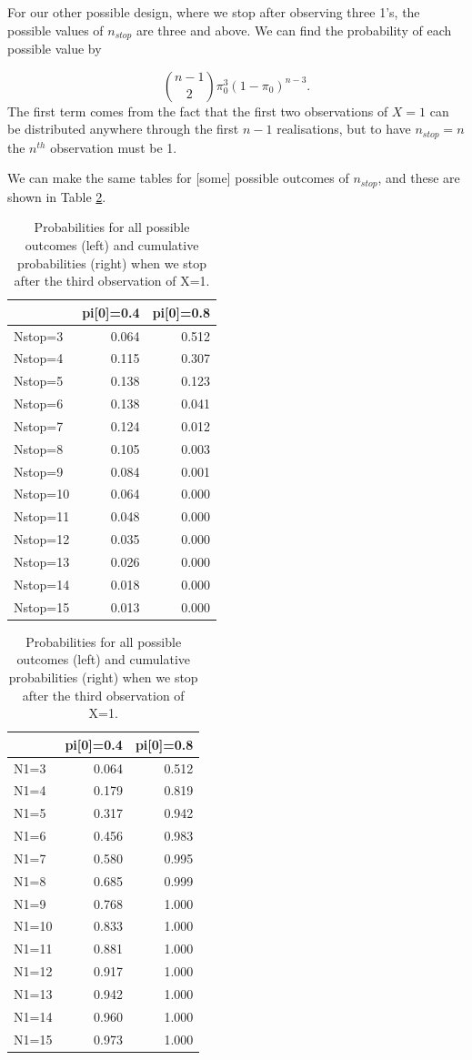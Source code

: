 \documentclass[
  openany]{book}
\theoremstyle{definition}
\theoremstyle{definition}
\theoremstyle{definition}
\theoremstyle{definition}
\theoremstyle{remark}
\begin{document}
For our other possible design, where we stop after observing three 1's, the possible values of \(n_{stop}\) are three and above.
We can find the probability of each possible value by

\[ \binom{n-1}{2} \pi_0^3\left(1-\pi_0\right)^{n-3}.\]
The first term comes from the fact that the first two observations of \(X=1\) can be distributed anywhere through the first \(n-1\) realisations, but to have \(n_{stop}=n\) the \(n^{th}\) observation must be 1.

We can make the same tables for {[}some{]} possible outcomes of \(n_{stop}\), and these are shown in Table \ref{tab:bin2}.

\begin{table}
\caption{\label{tab:bin2}Probabilities for all possible outcomes (left) and cumulative probabilities (right) when we stop after the third observation of X=1.}

\centering
\begin{tabular}[t]{lrr}
\toprule
  & pi[0]=0.4 & pi[0]=0.8\\
\midrule
Nstop=3 & 0.064 & 0.512\\
Nstop=4 & 0.115 & 0.307\\
Nstop=5 & 0.138 & 0.123\\
Nstop=6 & 0.138 & 0.041\\
Nstop=7 & 0.124 & 0.012\\
\addlinespace
Nstop=8 & 0.105 & 0.003\\
Nstop=9 & 0.084 & 0.001\\
Nstop=10 & 0.064 & 0.000\\
Nstop=11 & 0.048 & 0.000\\
Nstop=12 & 0.035 & 0.000\\
\addlinespace
Nstop=13 & 0.026 & 0.000\\
Nstop=14 & 0.018 & 0.000\\
Nstop=15 & 0.013 & 0.000\\
\bottomrule
\end{tabular}
\centering
\begin{tabular}[t]{lrr}
\toprule
  & pi[0]=0.4 & pi[0]=0.8\\
\midrule
N1=3 & 0.064 & 0.512\\
N1=4 & 0.179 & 0.819\\
N1=5 & 0.317 & 0.942\\
N1=6 & 0.456 & 0.983\\
N1=7 & 0.580 & 0.995\\
\addlinespace
N1=8 & 0.685 & 0.999\\
N1=9 & 0.768 & 1.000\\
N1=10 & 0.833 & 1.000\\
N1=11 & 0.881 & 1.000\\
N1=12 & 0.917 & 1.000\\
\addlinespace
N1=13 & 0.942 & 1.000\\
N1=14 & 0.960 & 1.000\\
N1=15 & 0.973 & 1.000\\
\bottomrule
\end{tabular}
\end{table}
\end{document}
